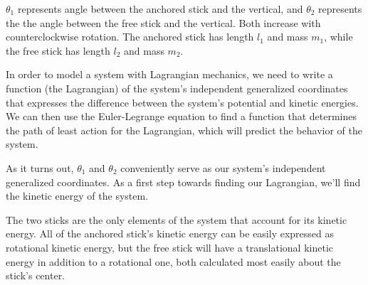 \documentclass[]{article}
\begin{document}
$\theta_1$ represents angle between the anchored stick and the vertical, and $\theta_2$ represents the the angle between the free stick and the vertical. Both increase with counterclockwise rotation. The anchored stick has length $l_1$ and mass $m_1$, while the free stick has length $l_2$ and mass $m_2$.

In order to model a system with Lagrangian mechanics, we need to write a function (the Lagrangian) of the system's independent generalized coordinates that expresses the difference between the system's potential and kinetic energies. We can then use the Euler-Legrange equation to find a function that determines the path of least action for the Lagrangian, which will predict the behavior of the system.

As it turns out, $\theta_1$ and $\theta_2$ conveniently serve as our system's independent generalized coordinates. As a first step towards finding our Lagrangian, we'll find the kinetic energy of the system.

The two sticks are the only elements of the system that account for its kinetic energy. All of the anchored stick's kinetic energy can be easily expressed as rotational kinetic energy, but the free stick will have a translational kinetic energy in addition to a rotational one, both calculated most easily about the stick's center.
\end{document}
